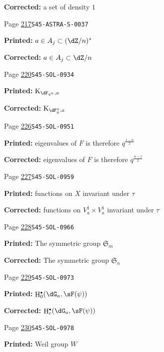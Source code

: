 \documentclass[oneside]{book}
\DeclareMathOperator{\h}{H}
\newcommand{\kloos}{\textnormal{K}} %
\theoremstyle{sga-source}
\theoremstyle{sga-source-dash}
\theoremstyle{sga-source-dotdash}
\theoremstyle{sga-source-number-note-dash}
\theoremstyle{sga-source-note-number-dotdash}
\theoremstyle{sga-source-example-dotdash}
\theoremstyle{sga-source-inline-number}
\theoremstyle{sga-source-bare-number}
\theoremstyle{sga-source}
\let\oldbullet\bullet
\renewcommand{\bullet}{\textnormal{\tiny$\oldbullet$}}
\begin{document}
\begin{description}
\par\noindent\textbf{Corrected:} a set of density $1$
\smallskip
\item[\hypertarget{apparatus:EN-0161}{161}] Page \hyperlink{printpage:en:217}{217}\quad\texttt{S45-ASTRA-S-0037}
\par\noindent\textbf{Printed:} $a\in A_j\subset (\dZ/n)^\ast$
\par\noindent\textbf{Corrected:} $a\in A_j\subset\dZ/n$
\smallskip
\item[\hypertarget{apparatus:EN-0162}{162}] Page \hyperlink{printpage:en:220}{220}\quad\texttt{S45-SOL-0934}
\par\noindent\textbf{Printed:} \(\kloos_{\dF_{q^n},a}\)
\par\noindent\textbf{Corrected:} \(\kloos_{\dF_q^n,a}\)
\smallskip
\item[\hypertarget{apparatus:EN-0163}{163}] Page \hyperlink{printpage:en:226}{226}\quad\texttt{S45-SOL-0951}
\par\noindent\textbf{Printed:} eigenvalues of $F$ is therefore $q^{\frac{1-n}{2}}$
\par\noindent\textbf{Corrected:} eigenvalues of $F$ is therefore $q^{\frac{n-1}{2}}$
\smallskip
\item[\hypertarget{apparatus:EN-0164}{164}] Page \hyperlink{printpage:en:227}{227}\quad\texttt{S45-SOL-0959}
\par\noindent\textbf{Printed:} functions on $X$ invariant under $\tau$
\par\noindent\textbf{Corrected:} functions on $V_a^1\times V_a^1$ invariant under $\tau$
\smallskip
\item[\hypertarget{apparatus:EN-0165}{165}] Page \hyperlink{printpage:en:228}{228}\quad\texttt{S45-SOL-0966}
\par\noindent\textbf{Printed:} The symmetric group $\mathfrak{S}_m$
\par\noindent\textbf{Corrected:} The symmetric group $\mathfrak{S}_n$
\smallskip
\item[\hypertarget{apparatus:EN-0166}{166}] Page \hyperlink{printpage:en:229}{229}\quad\texttt{S45-SOL-0973}
\par\noindent\textbf{Printed:} \(\h_0^\bullet(\dG_a,\sF(\psi))\)
\par\noindent\textbf{Corrected:} \(\h_c^\bullet(\dG_a,\sF(\psi))\)
\smallskip
\item[\hypertarget{apparatus:EN-0167}{167}] Page \hyperlink{printpage:en:230}{230}\quad\texttt{S45-SOL-0978}
\par\noindent\textbf{Printed:} Weil group $W$

\end{description}
\end{document}
